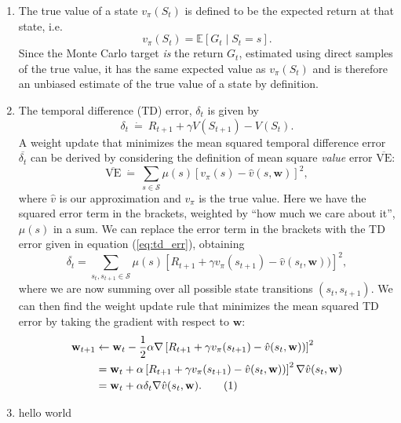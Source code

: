 \documentclass{article}
\newcommand\numberthis{\addtocounter{equation}{1}\tag{\theequation}}
\begin{document}
\begin{enumerate}
	\item The true value of a state $v_\pi(S_t)$ is defined to be the expected return at that state,
	      i.e.
	      \begin{equation}
		      v_\pi(S_t) = \mathbb{E}\left[ G_t \mid S_t = s \right].
	      \end{equation}
	      Since the Monte Carlo target \textit{is} the return $G_t$, estimated using direct samples of
	      the true value, it has the same expected value as $v_\pi(S_t)$ and is therefore an unbiased
	      estimate of the true value of a state by definition.
	\item The temporal difference (TD) error, $\delta_t$ is given by
	      \begin{equation}
		      \delta_t ~\dot{=}~ R_{t+1} + \gamma V(S_{t+1}) - V(S_t).\label{eq:td_err}
	      \end{equation}
	      A weight update that minimizes the mean squared temporal difference error
	      $\overline{\delta_t}$ can be derived by considering the definition of mean square
	      \textit{value} error $\overline{\text{VE}}$:
	      \begin{equation}
		      \overline{\text{VE}} ~ \dot{=} ~ \sum_{s \in \mathcal{S}} \mu(s) \left[v_\pi(s)
			      - \hat{v}(s, \mathbf{w})\right]^2,
	      \end{equation}
	      where $\hat{v}$ is our approximation and $v_\pi$ is the true value. Here we have the squared
	      error term in the brackets, weighted by ``how much we care about it'', $\mu(s)$ in a sum. We
	      can replace the error term in the brackets with the TD error given in equation
	      (\ref{eq:td_err}), obtaining
	      \begin{equation}
		      \overline{\delta_t} = \sum_{s_t, s_{t+1} \in \mathcal{S}} \mu(s) \left[R_{t+1} + \gamma
			      v_\pi(s_{t+1}) - \hat{v}(s_t, \mathbf{w}))\right]^2,
	      \end{equation}
	      where we are now summing over all possible state transitions $(s_t, s_{t+1})$.  We can then
	      find the weight update rule that minimizes the mean squared TD error by taking the gradient
	      with respect to $\mathbf{w}$:
	      \begin{align*}
		      \mathbf{w}_{t+1} & \leftarrow \mathbf{w}_t - \frac{1}{2} \alpha \nabla\left[R_{t+1}
		      + \gamma v_\pi(s_{t+1}) - \hat{v}(s_t, \mathbf{w}))\right]^2                        \\
		                       & = \mathbf{w}_t + \alpha \left[R_{t+1} + \gamma v_\pi(s_{t+1})
		      - \hat{v}(s_t, \mathbf{w}))\right]^2 \nabla \hat{v}(s_t, \mathbf{w})                \\
		                       & = \mathbf{w}_t + \alpha \delta_t \nabla \hat{v}(s_t,
		      \mathbf{w}). \numberthis
	      \end{align*}
	\item hello world
\end{enumerate}
\end{document}
